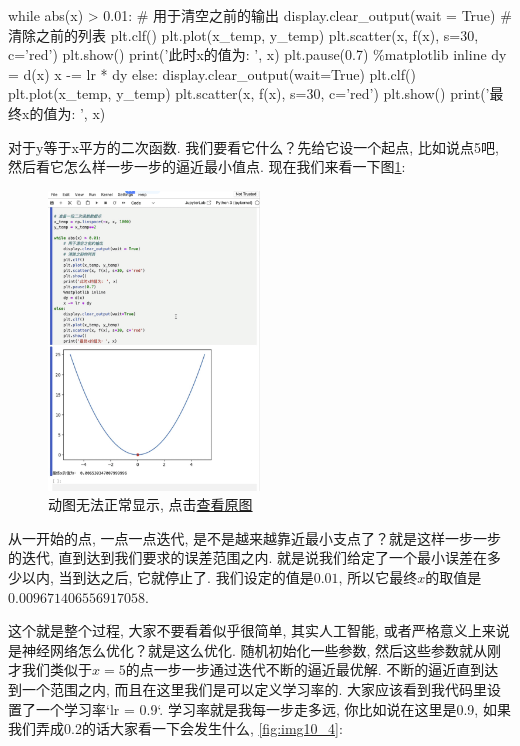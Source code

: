 \begin{python}
while abs(x) > 0.01:
    # 用于清空之前的输出
    display.clear_output(wait = True) 
    # 清除之前的列表
    plt.clf()
    plt.plot(x_temp, y_temp)
    plt.scatter(x, f(x), s=30, c='red')
    plt.show()
    print('此时x的值为: ', x)
    plt.pause(0.7)
    \%matplotlib inline
    dy = d(x)
    x -= lr * dy
else:
    display.clear_output(wait=True)
    plt.clf()
    plt.plot(x_temp, y_temp)
    plt.scatter(x, f(x), s=30, c='red')
    plt.show()
    print('最终x的值为: ', x)
\end{python}


对于y等于x平方的二次函数. 我们要看它什么？先给它设一个起点, 比如说点5吧, 然后看它怎么样一步一步的逼近最小值点. 现在我们来看一下图\ref{fig:img10_3}: 

\begin{figure}[ht]
  \centering
  \includegraphics[width=0.5\textwidth]{asset/截屏2023-12-31 12.45.38.png}
  \caption{动图无法正常显示, 点击\href{https://raw.githubusercontent.com/hivandu/notes/main/img/20230830160512.gif}{查看原图}}
  \label{fig:img10_3}
\end{figure}

从一开始的点, 一点一点迭代, 是不是越来越靠近最小支点了？就是这样一步一步的迭代, 直到达到我们要求的误差范围之内. 就是说我们给定了一个最小误差在多少以内, 当到达之后, 它就停止了. 我们设定的值是$0.01$, 所以它最终$x$的取值是 $0.009671406556917058$. 

这个就是整个过程, 大家不要看着似乎很简单, 其实人工智能, 或者严格意义上来说是神经网络怎么优化？就是这么优化. 随机初始化一些参数, 然后这些参数就从刚才我们类似于$x=5$的点一步一步通过迭代不断的逼近最优解. 不断的逼近直到达到一个范围之内, 而且在这里我们是可以定义学习率的. 大家应该看到我代码里设置了一个学习率`lr = 0.9`. 学习率就是我每一步走多远, 你比如说在这里是0.9, 如果我们弄成0.2的话大家看一下会发生什么, \ref{fig:img10_4}: 

